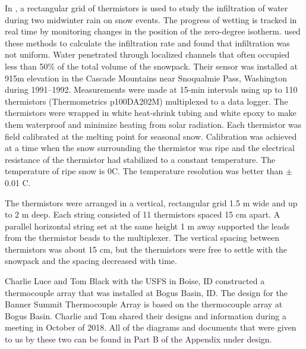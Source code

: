 In \citet{conway_benedict_1994}, a rectangular grid of thermistors is used to study the infiltration of water during two midwinter rain on snow events. The progress of wetting is tracked in real time by monitoring changes in the position of the zero-degree isotherm. \citet{conway_benedict_1994} used these methods to calculate the infiltration rate and found that infiltration was not uniform. Water penetrated through localized channels that often occupied less than 50\% of the total volume of the snowpack. Their sensor was installed at 915m elevation in the Cascade Mountains near Snoqualmie Pass, Washington during 1991--1992. Measurements were made at 15-min intervals using up to 110 thermistors (Thermometrics p100DA202M) multiplexed to a data logger. The thermistors were wrapped in white heat-shrink tubing and white epoxy to make them waterproof and minimize heating from solar radiation. Each thermistor was field calibrated at the melting point for seasonal snow. Calibration was achieved at a time when the snow surrounding the thermistor was ripe and the electrical resistance of the thermistor had stabilized to a constant temperature. The temperature of ripe snow is 0\textdegree C. The temperature resolution was better than $\pm$ 0.01 \textdegree C.
 
The thermistors were arranged in a vertical, rectangular grid 1.5 m wide and up to 2 m deep. Each string consisted of 11 thermistors spaced 15 cm apart. A parallel horizontal string set at the same height 1 m away supported the leads from the thermistor beads to the multiplexer. The vertical spacing between thermistors was about 15 cm, but the thermistors were free to settle with the snowpack and the spacing decreased with time. 

Charlie Luce and Tom Black with the USFS \citep{Black_Luce} in Boise, ID constructed a thermocouple array that was installed at Bogus Basin, ID. The design for the Banner Summit Thermocouple Array is based on the thermocouple array at Bogus Basin. Charlie and Tom shared their designs and information during a meeting in October of 2018. All of the diagrams and documents that were given to us by these two can be found in Part B of the Appendix under design. 

